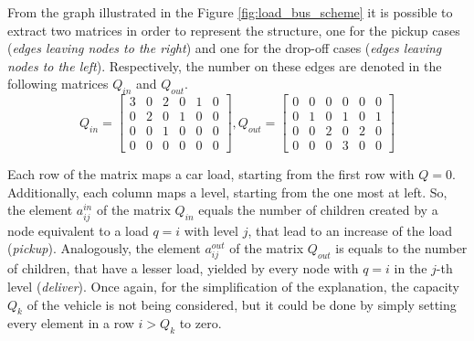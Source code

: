 \documentclass[tuberlin,cic,tc,openright,english,noabntcite,oneside]{iiufrgs}
\begin{document}
From the graph illustrated in the Figure \ref{fig:load_bus_scheme} it is possible to extract two matrices in order to represent the structure, one for the pickup cases (\emph{edges leaving nodes to the right}) and one for the drop-off cases (\emph{edges leaving nodes to the left}). Respectively, the number on these edges are denoted in the following matrices $Q_{in}$ and $Q_{out}$.
$$
Q_{in} = 
\begin{bmatrix}
3 & 0 & 2 & 0 & 1 & 0\\
0 & 2 & 0 & 1 & 0 & 0\\
0 & 0 & 1 & 0 & 0 & 0\\
0 & 0 & 0 & 0 & 0 & 0
\end{bmatrix}
,
Q_{out} = 
\begin{bmatrix}
0 & 0 & 0 & 0 & 0 & 0\\
0 & 1 & 0 & 1 & 0 & 1\\
0 & 0 & 2 & 0 & 2 & 0\\
0 & 0 & 0 & 3 & 0 & 0
\end{bmatrix}
$$

Each row of the matrix maps a car load, starting from the first row with $Q=0$. Additionally, each column maps a level, starting from the one most at left. So, the element $a^{in}_{ij}$ of the matrix $Q_{in}$ equals the number of children created by a node equivalent to a load $q=i$ with level $j$, that lead to an increase of the load (\emph{pickup}). Analogously, the element $a^{out}_{ij}$ of the matrix $Q_{out}$ is equals to the number of children, that have a lesser load, yielded by every node with $q=i$ in the $j$-th level (\emph{deliver}). Once again, for the simplification of the explanation, the capacity $Q_k$ of the vehicle is not being considered, but it could be done by simply setting every element in a row $i>Q_k$ to zero.
\end{document}
